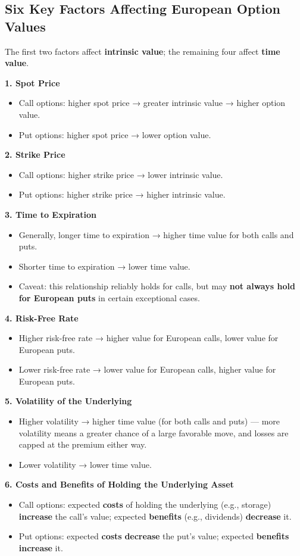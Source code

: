 \documentclass[12pt,openany]{book}
\theoremstyle{definition}
\theoremstyle{remark}
\begin{document}
\subsection{Six Key Factors Affecting European Option Values}

The first two factors affect \textbf{intrinsic value}; the remaining four affect \textbf{time value}.

\textbf{1. Spot Price}
\begin{itemize}
\item Call options: higher spot price → greater intrinsic value → higher option value.
\item Put options: higher spot price → lower option value.
\end{itemize}
\textbf{2. Strike Price}
\begin{itemize}
\item Call options: higher strike price → lower intrinsic value.
\item Put options: higher strike price → higher intrinsic value.
\end{itemize}
\textbf{3. Time to Expiration}
\begin{itemize}
\item Generally, longer time to expiration → higher time value for both calls and puts.
\item Shorter time to expiration → lower time value.
\item Caveat: this relationship reliably holds for calls, but may \textbf{not always hold for European puts} in certain exceptional cases.
\end{itemize}
\textbf{4. Risk-Free Rate}
\begin{itemize}
\item Higher risk-free rate → higher value for European calls, lower value for European puts.
\item Lower risk-free rate → lower value for European calls, higher value for European puts.
\end{itemize}
\textbf{5. Volatility of the Underlying}
\begin{itemize}
\item Higher volatility → higher time value (for both calls and puts) — more volatility means a greater chance of a large favorable move, and losses are capped at the premium either way.
\item Lower volatility → lower time value.
\end{itemize}
\textbf{6. Costs and Benefits of Holding the Underlying Asset}
\begin{itemize}
\item Call options: expected \textbf{costs} of holding the underlying (e.g., storage) \textbf{increase} the call's value; expected \textbf{benefits} (e.g., dividends) \textbf{decrease} it.
\item Put options: expected \textbf{costs} \textbf{decrease} the put's value; expected \textbf{benefits} \textbf{increase} it.
\end{itemize}
\end{document}
